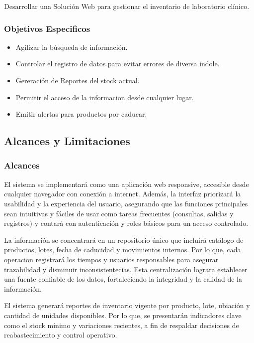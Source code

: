 \documentclass[12pt]{article} %
\begin{document}
Desarrollar una Solución Web para gestionar el inventario de laboratorio clínico.

\subsubsection{Objetivos Especificos}

\begin{itemize}
    \item Agilizar la búsqueda de información.
    \item Controlar el registro de datos para evitar errores de diversa índole.
    \item Gereración de Reportes del stock actual.
    \item Permitir el acceso de la informacion desde cualquier lugar.
    \item Emitir alertas para productos por caducar.
\end{itemize}



\subsection{Alcances y Limitaciones}

\subsubsection{Alcances}

El sistema se implementará como una aplicación web responsive, accesible desde cualquier navegador con conexión a internet. Además, la interfaz priorizará la usabilidad y la experiencia del usuario, asegurando que las funciones principales sean intuitivas y fáciles de usar como tareas frecuentes (consultas, salidas y registros) y contará con autenticación y roles básicos para un acceso controlado.

La información se concentrará en un repositorio único que incluirá catálogo de productos, lotes, fecha de caducidad y movimientos internos. Por lo que, cada operacion registrará los tiempos y usuarios responsables para asegurar trazabilidad y disminuir inconsistentecias. Esta centralización lograra establecer una fuente confiable de los datos, fortaleciendo la integridad y la calidad de la información.

El sistema generará reportes de inventario vigente por producto, lote, ubiación y cantidad de unidades disponibles. Por lo que, se presentarán indicadores clave como el stock mínimo y variaciones recientes, a fin de respaldar decisiones de reabastecimiento y control operativo. 
\end{document}
